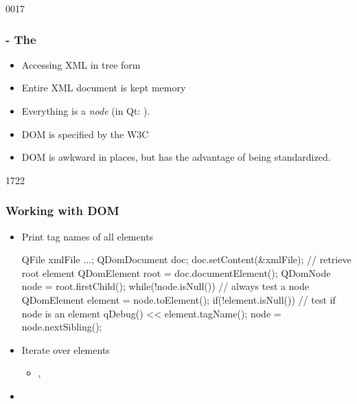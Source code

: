\begin{slide}[fragile]{0017}
\label{qdom}
        \frametitle{ - The }\label{qdom}
\begin{itemize}
  \item Accessing XML in tree form
  \item Entire XML document is kept memory
  \item Everything is a \emph{node} (in Qt: ).
  \item DOM is specified by the W3C
  \item DOM is awkward in places, but has the advantage of being standardized.
  \end{itemize}
\end{slide}
\begin{slide}[fragile]{1722}\frametitle{Working with DOM}
\begin{itemize}
\item Print tag names of all elements
   \begin{cpp}
QFile xmlFile ...;
QDomDocument doc;      
doc.setContent(&xmlFile);
// retrieve root element
QDomElement root = doc.documentElement();
QDomNode node = root.firstChild();
while(!node.isNull()) { // always test a node
  QDomElement element = node.toElement();
  if(!element.isNull()) { // test if node is an element
    qDebug() << element.tagName();
  }
  node = node.nextSibling();
}
    \end{cpp}
  \item Iterate over elements
    \begin{itemize}
    \item {}, 
    \end{itemize}
  \item {}
  \end{itemize}
\end{slide}

